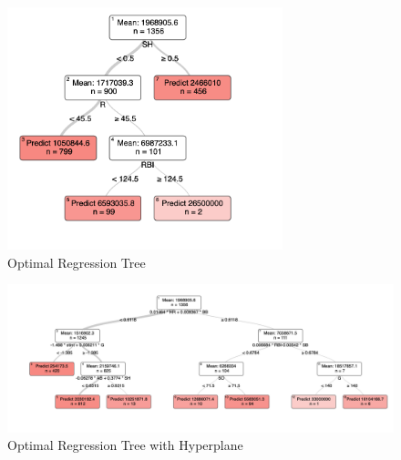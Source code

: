 \documentclass[11pt,a4paper]{report}
\begin{document}
\begin{figure}
    \centering
    \includegraphics[width = 8cm]{reportcharts/ort.png}
    \caption{Optimal Regression Tree}
    \label{fig:ort}
\end{figure}
\begin{figure}
    \centering
    \includegraphics[width = 12cm]{reportcharts/orth.png}
    \caption{Optimal Regression Tree with Hyperplane}
    \label{fig:orth}
\end{figure}
\end{document}
